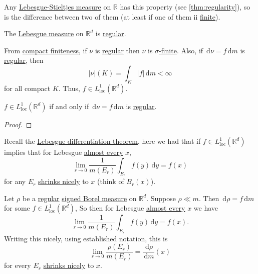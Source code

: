 \begin{eg}
	Any \hyperref[def:Lebesgue-Stieltjes-measure]{Lebesgue-Stieltjes measure} on \(\mathbb{R}\) has this property (see \autoref{thm:regularity}),
	so is the difference between two of them (at least if one of them ii \hyperref[def:finite-signed-measure]{finite}).

	The \hyperref[def:Lebesgue-measure]{Lebesgue measure} on \(\mathbb{R}^d\) is \hyperref[def:regular]{regular}.
\end{eg}

\begin{note}
	From \hyperref[def:regular-compact-finite]{compact finiteness}, if \(\nu\) is \hyperref[def:regular]{regular} then \(\nu\) is \hyperref[def:finite-signed-measure]{\(\sigma\)-finite}. Also,
	if \(\,\mathrm{d}\nu = f\,\mathrm{d}m\) is \hyperref[def:regular]{regular}, then
	\[
		\left\vert \nu \right\vert(K) = \int_K \left\vert f \right\vert \,\mathrm{d}m < \infty
	\]
	for all compact \(K\). Thus, \(f \in L^1_{\mathrm{loc}}(\mathbb{R}^d)\).
\end{note}

\begin{lemma}
	\(f \in L^1_{\mathrm{loc}}(\mathbb{R}^d)\) if and only if \(\,\mathrm{d}\nu = f \,\mathrm{d}m\) is \hyperref[def:regular]{regular}.
\end{lemma}
\begin{proof}
\end{proof}

\begin{prev}
	Recall the \hyperref[thm:Lebesgue-differentiation-theorem]{Lebesgue differentiation theorem}, here we had that if \(f \in L^1_{\mathrm{loc}}(\mathbb{R}^d)\)
	implies that for Lebesgue \hyperref[def:mu-almost-everywhere]{almost every} \(x\),
	\[
		\lim_{r \to 0} \frac{1}{m(E_r)} \int_{E_r} f(y) \,\mathrm{d}y = f(x)
	\]
	for any \(E_r\) \hyperref[def:shrink-nicely]{shrinks nicely} to \(x\) (think of \(B_r(x)\)).
\end{prev}

\begin{corollary}
	Let \(\rho\) be a \hyperref[def:regular]{regular} \hyperref[def:signed-measure]{signed Borel measure} on \(\mathbb{R}^d\). Suppose \(\rho \ll m\). Then
	\(\,\mathrm{d}\rho = f\,\mathrm{d}m\) for some \(f \in L^1_{\mathrm{loc}}(\mathbb{R}^d)\), So then for Lebesgue \hyperref[def:mu-almost-everywhere]{almost every} \(x\)
	we have
	\[
		\lim_{r \to 0} \frac{1}{m(E_r)} \int_{E_r} f(y) \,\mathrm{d}y = f(x).
	\]
	Writing this nicely, using established notation, this is
	\[
		\lim_{r \to 0} \frac{\rho(E_r)}{m(E_r)} = \frac{\,\mathrm{d}\rho}{\,\mathrm{d}m}(x)
	\]
	for every \(E_r\) \hyperref[def:shrink-nicely]{shrinks nicely} to \(x\).
\end{corollary}

